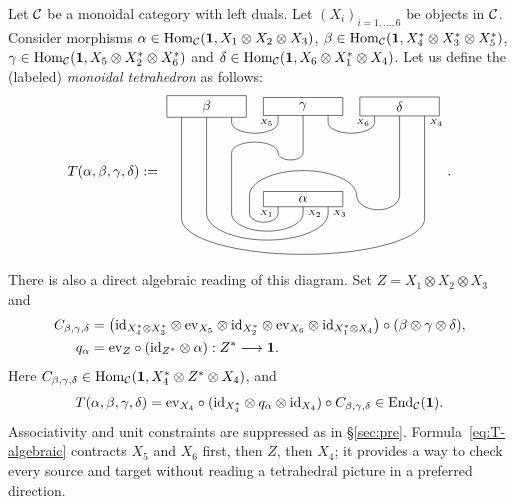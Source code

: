 \documentclass{amsart}
\begin{document}
\begin{definition} \label{def:TetraCat}
Let $\mC$ be a monoidal category with left duals. Let $(X_i)_{i=1,\dots,6}$ be objects in $\mC$. Consider morphisms $\alpha \in \hc(\one,X_1 \otimes X_2 \otimes X_3)$, $\beta \in \hc(\one,X_4^* \otimes X_3^* \otimes X_5^*)$, $\gamma \in \hc(\one,X_5 \otimes X_2^* \otimes X_6^*)$ and $\delta \in \hc(\one,X_6 \otimes X_1^* \otimes X_4)$. Let us define the (labeled) \emph{monoidal tetrahedron} as follows:
$$
T(\alpha, \beta, \gamma, \delta):=
\raisebox{-2cm}{
\begin{tikzpicture}[scale=.9]
\draw (-.7+0.6,0)--++(0,-.4) node [left] {\tiny ${X_1}$} arc (0:-180:.4 and .25) --++(0,.5) arc (180:0:1.5 and .7) arc (-180:0:.6 and .4)  --++(0,2.5);
\draw (0+0.6,0)--++(0,-.4) node [right] {\tiny ${X_2}$} arc (0:-180:1 and .5) --++(0,1.7) arc (180:0:.65 and .3) arc (-180:0:.35 and .2) --++(0,1.3);
\draw (.7+0.6,0)--++(0,-.4) node [right] {\tiny ${X_3}$} arc (0:-180:1.7 and .75) --++(0,3);

\draw (-2.1-.7,2.6)--++(0,-.45) --++(0,-2.7) arc (-180:0:3.4 and 1);
\draw (-2.1+.7,2.6)--++(0,-.45) arc (-180:0:.65 and .3);

\draw (0.6-.7,2.6)--++(0,-.45)  node [left] {\tiny ${X_5}$};
\draw (0.6+.7,2.6)--++(0,-.45) arc (-180:0:.65 and .3);

\draw (3.3-.7,2.6)--++(0,-.45) node [left] {\tiny ${X_6}$};
\draw (3.3+.7,2.6)--++(0,-.45) node [right] {\tiny ${X_4}$} --++(0,-2.7);

\draw (0.6,0) node [draw,fill=white,minimum width=2cm] {$\alpha$};
\draw (-2.1,2.6) node [draw,fill=white,minimum width=2cm] {$\beta$};
\draw (0.6,2.6) node [draw,fill=white,minimum width=2cm] {$\gamma$};
\draw (3.3,2.6) node [draw,fill=white,minimum width=2cm] {$\delta$};
\end{tikzpicture}}.
$$
\end{definition}
There is also a direct algebraic reading of this diagram. Set $Z=X_1\otimes X_2\otimes X_3$ and
\begin{align}
 C_{\beta,\gamma,\delta}
 &=\bigl(\id_{X_4^*\otimes X_3^*}\otimes\ev_{X_5}
       \otimes\id_{X_2^*}\otimes\ev_{X_6}
       \otimes\id_{X_1^*\otimes X_4}\bigr)
       \circ(\beta\otimes\gamma\otimes\delta),\notag\\
 q_\alpha&=\ev_Z\circ(\id_{Z^*}\otimes\alpha):Z^*\longrightarrow\one.\notag
\end{align}
Here $C_{\beta,\gamma,\delta}\in\hc(\one,X_4^*\otimes Z^*\otimes X_4)$, and
\begin{equation}\label{eq:T-algebraic}
 T(\alpha,\beta,\gamma,\delta)
 =\ev_{X_4}\circ(\id_{X_4^*}\otimes q_\alpha\otimes\id_{X_4})
      \circ C_{\beta,\gamma,\delta}\in\End_{\mC}(\one).
\end{equation}
Associativity and unit constraints are suppressed as in \S\ref{sec:pre}. Formula~\eqref{eq:T-algebraic} contracts $X_5$ and $X_6$ first, then $Z$, then $X_4$; it provides a way to check every source and target without reading a tetrahedral picture in a preferred direction.
\end{document}
